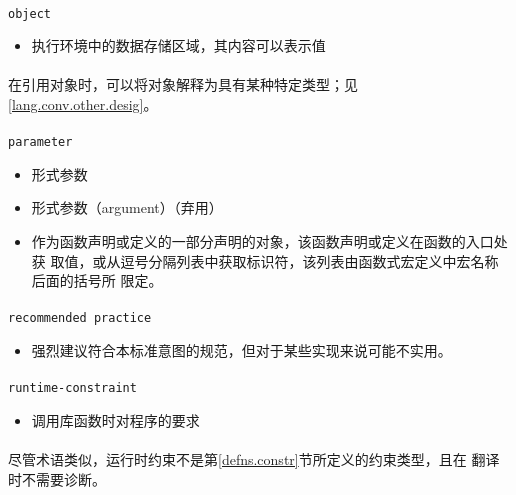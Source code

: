 \paragraph{}
\texttt{object}
\begin{itemize}
  \item[]{执行环境中的数据存储区域，其内容可以表示值}
\end{itemize}

\paragraph{}
\notes* 在引用对象时，可以将对象解释为具有某种特定类型；见
\ref{lang.conv.other.desig}。

\paragraph{}
\texttt{parameter}
\begin{itemize}
  \item[]{形式参数}
  \item[]{形式参数（argument）（弃用）}
  \item[]{作为函数声明或定义的一部分声明的对象，该函数声明或定义在函数的入口处获
    取值，或从逗号分隔列表中获取标识符，该列表由函数式宏定义中宏名称后面的括号所
    限定。}
\end{itemize}

\paragraph{}
\texttt{recommended practice}
\begin{itemize}
  \item[]{强烈建议符合本标准意图的规范，但对于某些实现来说可能不实用。}
\end{itemize}

\paragraph{}
\texttt{runtime-constraint}
\begin{itemize}
  \item[]{调用库函数时对程序的要求}
\end{itemize}

\paragraph{}
\notes 尽管术语类似，运行时约束不是第\ref{defns.constr}节所定义的约束类型，且在
翻译时不需要诊断。

